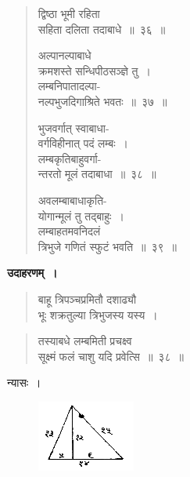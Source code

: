 \documentclass[11pt, openany]{book}
\begin{document}
\newpage%
 \label{4.36}
\begin{quote}
    \bs 
द्विष्ठा भूमी रहिता \\
सहिता दलिता तदाबाधे~॥~३६~॥ 
\vspace{1mm}

अल्पानल्पाबाधे \\
क्रमशस्ते सन्धिपीठसञ्ज्ञे तु~।\\
लम्बनिपातादल्पा-\\
नल्पभुजदिगाश्रिते भवतः~॥~३७~॥ 
\vspace{1mm}

 \label{4.38}
भुजवर्गात् स्वाबाधा-\\
वर्गविहीनात् पदं लम्बः~।\\
लम्बकृतिबाहुवर्गा-\\
न्तरतो मूलं तदाबाधा~॥~३८~॥
\vspace{1mm}

 \label{4.39}
अवलम्बाबाधाकृति-\\
योगान्मूलं तु तद्बाहुः~।\\
लम्बाहतमवनिदलं \\
त्रिभुजे गणितं स्फुटं भवति~॥~३९~॥
\end{quote}

 \textbf{उदाहरणम्~।} 
\begin{quote}
    \bqt 
बाहू त्रिपञ्चप्रमितौ दशाढ्यौ \\
भूः शक्रतुल्या त्रिभुजस्य यस्य~।
\end{quote}
\newpage

\begin{quote}
    \bqt 
तस्याबधे लम्बमिती प्रचक्ष्व \\
सूक्ष्मं फलं चाशु यदि प्रवेत्सि~॥~३८~॥
\end{quote}

 न्यासः~। 
 \vspace{-2mm}
 
\begin{figure}[h!]
    \centering
    \includegraphics[scale=0.8]{graphics/capture44.png}
\end{figure}
 \vspace{-2mm}
\end{document}
